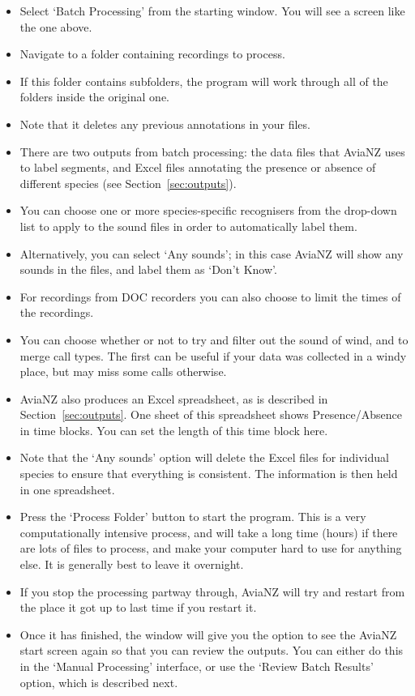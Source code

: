 \documentclass{article}
\begin{document}
\begin{itemize}
\item Select `Batch Processing' from the starting window. You will see a screen like the one above. 
\item Navigate to a folder containing recordings to process. 
\item If this folder contains subfolders, the program will work through all of the folders inside the original one. 
\item Note that it deletes any previous annotations in your files. 
\item There are two outputs from batch processing: the data files that AviaNZ uses to label segments, and Excel files annotating the presence or absence of different species (see Section~\ref{sec:outputs}).
\item You can choose one or more species-specific recognisers from the drop-down list to apply to the sound files in order to automatically label them. 
\item Alternatively, you can select `Any sounds'; in this case AviaNZ will show any sounds in the files, and label them as `Don't Know'. 
\item For recordings from DOC recorders you can also choose to limit the times of the recordings. 
\item You can choose whether or not to try and filter out the sound of wind, and to merge call types. The first can be useful if your data was collected in a windy place, but may miss some calls otherwise. 
\item AviaNZ also produces an Excel spreadsheet, as is described in Section~\ref{sec:outputs}. One sheet of this spreadsheet shows Presence/Absence in time blocks. You can set the length of this time block here.
\item Note that the `Any sounds' option will delete the Excel files for individual species to ensure that everything is consistent. The information is then held in one spreadsheet.  
\item Press the `Process Folder' button to start the program. This is a very computationally intensive process, and will take a long time (hours) if there are lots of files to process, and make your computer hard to use for anything else. It is generally best to leave it overnight.
\item If you stop the processing partway through, AviaNZ will try and restart from the place it got up to last time if you restart it.
\item Once it has finished, the window will give you the option to see the AviaNZ start screen again so that you can review the outputs. You can either do this in the `Manual Processing' interface, or use the `Review Batch Results' option, which is described next. 
\end{itemize}
\end{document}
